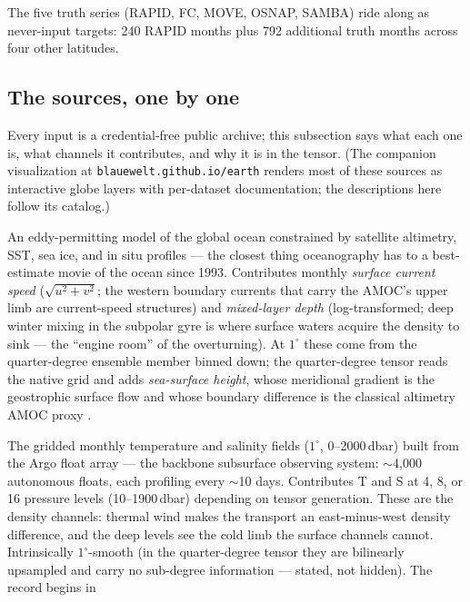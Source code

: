 \documentclass[10pt]{article}
\begin{document}
The five truth series (RAPID, FC, MOVE, OSNAP, SAMBA) ride along as
never-input targets: 240 RAPID months plus 792 additional truth months
across four other latitudes.

\subsection{The sources, one by one}\label{sec:sources}

Every input is a credential-free public archive; this subsection says
what each one is, what channels it contributes, and why it is in the
tensor. (The companion visualization at
\texttt{blauewelt.github.io/earth} renders most of these sources as
interactive globe layers with per-dataset documentation; the
descriptions here follow its catalog.)

\begin{description}\itemsep2pt
\item[GLORYS ocean reanalysis (CMEMS).] An eddy-permitting model of the
  global ocean constrained by satellite altimetry, SST, sea ice, and in
  situ profiles --- the closest thing oceanography has to a
  best-estimate movie of the ocean since 1993. Contributes monthly
  \emph{surface current speed} ($\sqrt{u^2+v^2}$; the western boundary
  currents that carry the AMOC's upper limb are current-speed
  structures) and \emph{mixed-layer depth} (log-transformed; deep
  winter mixing in the subpolar gyre is where surface waters acquire
  the density to sink --- the ``engine room'' of the overturning). At
  $1^\circ$ these come from the quarter-degree ensemble member binned
  down; the quarter-degree tensor reads the native grid and adds
  \emph{sea-surface height}, whose meridional gradient is the
  geostrophic surface flow and whose boundary difference is the
  classical altimetry AMOC proxy \cite{fw2015}.
\item[Roemmich--Gilson Argo climatology.] The gridded monthly
  temperature and salinity fields ($1^\circ$, 0--2000\,dbar) built from
  the Argo float array \cite{rg2009} --- the backbone subsurface
  observing system: $\sim$4{,}000 autonomous floats, each profiling
  every $\sim$10 days. Contributes T and S at 4, 8, or 16 pressure
  levels (10--1900\,dbar) depending on tensor generation. These are the
  density channels: thermal wind makes the transport an east-minus-west
  density difference, and the deep levels see the cold limb the surface
  channels cannot. Intrinsically $1^\circ$-smooth (in the
  quarter-degree tensor they are bilinearly upsampled and carry no
  sub-degree information --- stated, not hidden). The record begins in

\end{description}
\end{document}
